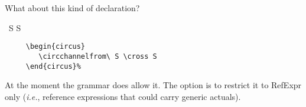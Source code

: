 \documentclass{article}
\newcommand{\code}[1]{\textsf{#1}}
\begin{document}
%
\begin{issue}
What about this kind of declaration?
%
\begin{circus}
   \circchannelfrom\ S \cross S
\end{circus}%
%
\begin{verbatim}
     \begin{circus}
        \circchannelfrom\ S \cross S
     \end{circus}%
\end{verbatim}

At the moment the grammar does allow it. The option is to restrict it to
\code{RefExpr} only (\textit{i.e.}, reference expressions that could carry
generic actuals).
\end{issue}
\end{document}
